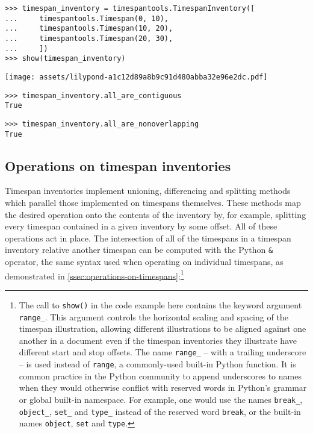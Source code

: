 \begin{abjadbookoutput}
\begin{singlespacing}
\vspace{-0.5\baselineskip}
\begin{verbatim}
>>> timespan_inventory = timespantools.TimespanInventory([
...     timespantools.Timespan(0, 10),
...     timespantools.Timespan(10, 20),
...     timespantools.Timespan(20, 30),
...     ])
>>> show(timespan_inventory)
\end{verbatim}
\noindent\texttt{[image: assets/lilypond-a1c12d89a8b9c91d480abba32e96e2dc.pdf]}
\begin{verbatim}
>>> timespan_inventory.all_are_contiguous
True
\end{verbatim}
\begin{verbatim}
>>> timespan_inventory.all_are_nonoverlapping
True
\end{verbatim}
\end{singlespacing}
\end{abjadbookoutput}

\subsection{Operations on timespan inventories}
\label{ssec:operations-on-timespan-inventories}

Timespan inventories implement unioning, differencing and splitting methods
which parallel those implemented on timespans themselves. These methods map the
desired operation onto the contents of the inventory by, for example, splitting
every timespan contained in a given inventory by some offset. All of these
operations act in place. The intersection of all of the timespans in a timespan
inventory relative another timespan can be computed with the Python \texttt{\&}
operator, the same syntax used when operating on individual timespans, as
demonstrated in \autoref{ssec:operations-on-timespans}:\footnote{ The call to
\texttt{show()} in the code example here contains the keyword argument
\texttt{range\_}. This argument controls the horizontal scaling and spacing of
the timespan illustration, allowing different illustrations to be aligned
against one another in a document even if the timespan inventories they
illustrate have different start and stop offsets. The name \texttt{range\_} --
with a trailing underscore -- is used instead of \texttt{range}, a
commonly-used built-in Python function. It is common practice in the Python
community to append underscores to names when they would otherwise conflict
with reserved words in Python's grammar or global built-in namespace. For
example, one would use the names \texttt{break\_}, \texttt{object\_},
\texttt{set\_} and \texttt{type\_} instead of the reserved word \texttt{break},
or the built-in names \texttt{object}, \texttt{set} and \texttt{type}.}

